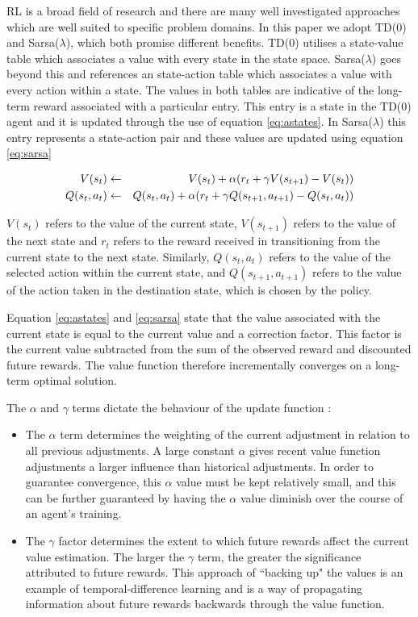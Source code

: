 \documentclass{rucsthesis}
\begin{document}
RL is a broad field of research and there are many well investigated approaches which are well suited to specific problem domains. In this paper we adopt TD(0) and Sarsa($\lambda$), which both promise different benefits. TD(0) utilises a state-value table which associates a value with every state in the state space. Sarsa($\lambda$) goes beyond this and references an state-action table which associates a value with every action within a state. The values in both tables are indicative of the long-term reward associated with a particular entry. This entry is a state in the TD(0) agent and it is updated through the use of equation \ref{eq:astates}. In Sarsa($\lambda$) this entry represents a state-action pair and these values are updated using equation \ref{eq:sarsa}

\begin{eqnarray}
\centering
V(s_t) & \leftarrow & V(s_t) + \alpha(r_{t} + \gamma V(s_{t+1}) - V(s_t)) \label{eq:astates} \\
Q(s_t,a_t) & \leftarrow & Q(s_t,a_t) + \alpha(r_{t} + \gamma Q(s_{t+1},a_{t+1}) - Q(s_t,a_t)) \label{eq:sarsa}
\end{eqnarray}

$V(s_t)$ refers to the value of the current state, $V(s_{t+1})$ refers to the value of the next state and $r_t$ refers to the reward received in transitioning from the current state to the next state. Similarly, $Q(s_t,a_t)$ refers to the value of the selected action within the current state, and $Q(s_{t+1},a_{t+1})$ refers to the value of the action taken in the destination state, which is chosen by the policy.

Equation \ref{eq:astates} and \ref{eq:sarsa} state that the value associated with the current state is equal to the current value and a correction factor. This factor is the current value subtracted from the sum of the observed reward and discounted future rewards. The value function therefore incrementally converges on a long-term optimal solution.

The $\alpha$ and $\gamma$ terms dictate the behaviour of the update function :

\begin{itemize}
\item{The $\alpha$ term determines the weighting of the current adjustment in relation to all previous adjustments. A large constant $\alpha$ gives recent value function adjustments a larger influence than historical adjustments. In order to guarantee convergence, this $\alpha$ value must be kept relatively small, and this can be further guaranteed by having the $\alpha$ value diminish over the course of an agent's training.}
\item{The $\gamma$ factor determines the extent to which future rewards affect the current value estimation. The larger the $\gamma$ term, the greater the significance attributed to future rewards. This approach of ``backing up" the values is an example of temporal-difference learning \citep{suttonbarto} and is a way of propagating information about future rewards backwards through the value function.}
\end{itemize}
\end{document}
